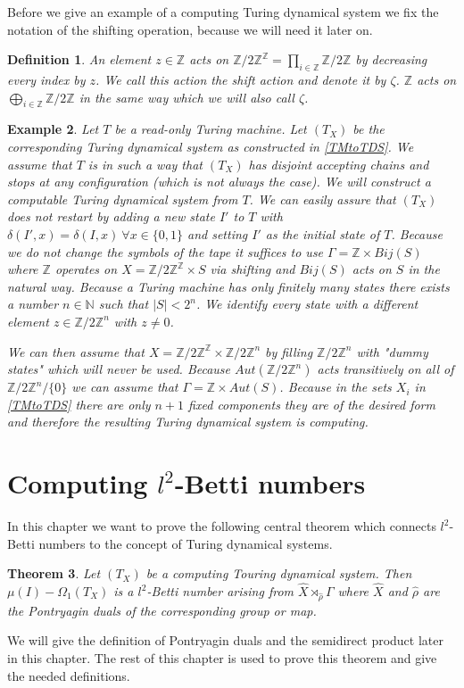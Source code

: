 \documentclass[12pt,a4paper]{scrartcl}
\newtheorem{Theorem}{Theorem}[section]
\newtheorem{Definition}[Theorem]{Definition}
\newtheorem{Example}[Theorem]{Example}
\numberwithin{equation}{section}
\newcommand{\Z}{\mathbb{Z}} %
\newcommand{\N}{\mathbb{N}} %
\newcommand{\2}{\mathbb{Z} / 2 \mathbb{Z}}
\newcommand{\1}{\overline{1}}
\newcommand{\0}{\overline{0}}
\begin{document}
Before we give an example of a computing Turing dynamical system we fix the notation of the shifting operation, because we will need it later on.
\begin{Definition} \label{shift}
	An element $z \in \Z$ acts on $\2^{\Z} = \prod_{i \in \Z} \2$ by decreasing every index by $z$. We call this action the shift action and denote it by $\zeta$. $\Z$ acts on $\bigoplus_{i \in \Z} \2$ in the same way which we will also call $\zeta$.
\end{Definition}
\begin{Example} \label{roTMtoTDS}
	Let $T$ be a read-only Turing machine. Let $(T_X)$ be the corresponding Turing dynamical system as constructed in \ref{TMtoTDS}. We assume that $T$ is in such a way that $(T_X)$ has disjoint accepting chains and stops at any configuration (which is not always the case). We will construct a computable Turing dynamical system from $T$.  We can easily assure that $(T_X)$ does not restart by adding a new state $I'$ to $T$ with $\delta(I', x) = \delta(I, x) \ \forall x \in \{0,1\}$ and setting $I'$ as the initial state of $T$. Because we do not change the symbols of the tape it suffices to use $\Gamma = \Z \times Bij(S)$ where $\Z$ operates on $X = \2^\Z \times S$ via shifting and $Bij(S)$ acts on $S$ in the natural way. Because a Turing machine has only finitely many states there exists a number $n \in \N$ such that $|S| < 2^n$. We identify every state with a different element $z \in \2^n$ with $z \neq 0$.
	
	 We can then assume that $X = \2^\Z \times \2^n$ by filling $\2^n$ with "dummy states" which will never be used. Because $Aut(\2^n)$ acts transitively on all of $\2^n / \{0\}$ we can assume that $\Gamma = \Z \times Aut(S)$. Because in the sets $X_i$ in \ref{TMtoTDS} there are only $n+1$ fixed components they are of the desired form and therefore the resulting Turing dynamical system is computing.
\end{Example}


\section{Computing $l^2$-Betti numbers}
In this chapter we want to prove the following central theorem which connects $l^2$-Betti numbers to the concept of Turing dynamical systems.
\begin{Theorem} \label{HS}
	Let $(T_X)$ be a computing Touring dynamical system. Then $\mu (I) - \Omega_1(T_X)$ is a $l^2$-Betti number arising from $\hat{X} \rtimes_{\hat{\rho}} \Gamma$ where $\hat{X}$ and $\hat{\rho}$ are the Pontryagin duals of the corresponding group or map.
\end{Theorem}
We will give the definition of Pontryagin duals and the semidirect product later in this chapter. The rest of this chapter is used to prove this theorem and give the needed definitions.
\end{document}
